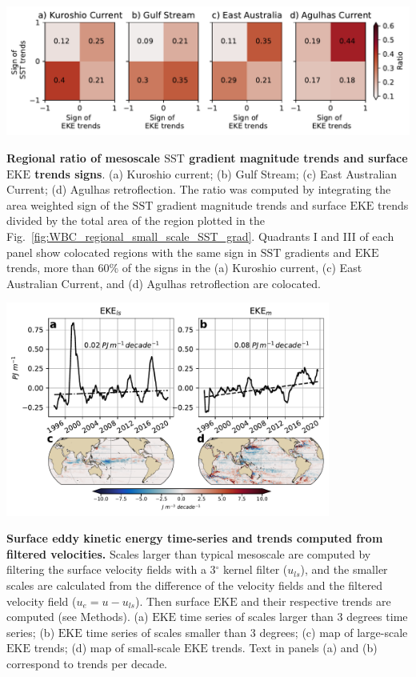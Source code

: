 \documentclass{nature}
\newcommand{\EKE}{\text{EKE}}
\newcommand{\SST}{\text{SST}}
\begin{document}
\begin{figureS}
    \centering
	\includegraphics[width=1\textwidth]{./figures/trends_sign_correlations.pdf}
	\caption{\textbf{Regional ratio of mesoscale $\SST$ gradient magnitude trends and surface $\EKE$ trends signs}. (a) Kuroshio current; (b) Gulf Stream; (c) East Australian Current; (d) Agulhas retroflection. The ratio was computed by integrating the area weighted sign of the $\SST$ gradient magnitude trends and surface $\EKE$ trends divided by the total area of the region plotted in the Fig.~\ref{fig:WBC_regional_small_scale_SST_grad}. Quadrants I and III of each panel show colocated regions with the same sign in $\SST$ gradients and $\EKE$ trends, more than 60\% of the signs in the (a) Kuroshio current, (c) East Australian Current, and (d) Agulhas retroflection are colocated. \label{fig:trends_sign_correlations}}
\end{figureS}

\begin{figureS}
    \centering
	\hspace{0.1\textwidth}\includegraphics[width=0.8\textwidth]{./figures/large_scale_vs_small_scalle_eke.pdf}
	\caption{\textbf{Surface eddy kinetic energy time-series and trends computed from filtered velocities.} Scales larger than typical mesoscale are computed by filtering the surface velocity fields with a 3$^\circ$ kernel filter ($u_{ls}$), and the smaller scales are calculated from the difference of the velocity fields and the filtered velocity field ($u_e = u - u_{ls}$). Then surface $\EKE$ and their respective trends are computed (see Methods). (a) $\EKE$ time series of scales larger than 3 degrees time series; (b) $\EKE$ time series of scales smaller than 3 degrees; (c) map of large-scale $\EKE$ trends; (d) map of small-scale $\EKE$ trends. Text in panels (a) and (b) correspond to trends per decade.\label{fig:mesoscale_decomposition_eke}}
\end{figureS}
\end{document}
